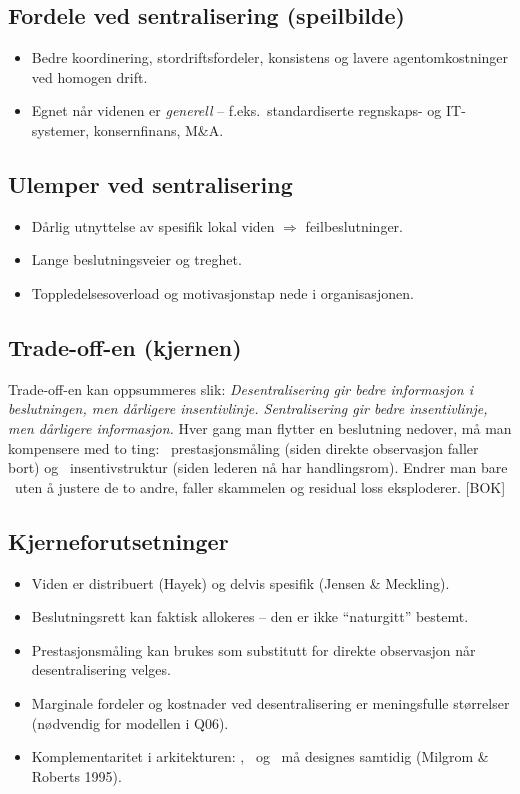 \subsection*{Fordele ved sentralisering (speilbilde)}
\begin{itemize}\setlength{\itemsep}{2pt}
\item Bedre koordinering, stordriftsfordeler, konsistens og lavere agentomkostninger ved homogen drift.
\item Egnet når videnen er \emph{generell} -- f.eks.\ standardiserte regnskaps- og IT-systemer, konsernfinans, M\&A.
\end{itemize}

\subsection*{Ulemper ved sentralisering}
\begin{itemize}\setlength{\itemsep}{2pt}
\item Dårlig utnyttelse av spesifik lokal viden $\Rightarrow$ feilbeslutninger.
\item Lange beslutningsveier og treghet.
\item Toppledelsesoverload og motivasjonstap nede i organisasjonen.
\end{itemize}

\subsection*{Trade-off-en (kjernen)}
Trade-off-en kan oppsummeres slik: \emph{Desentralisering gir bedre informasjon i beslutningen, men dårligere insentivlinje. Sentralisering gir bedre insentivlinje, men dårligere informasjon.} Hver gang man flytter en beslutning nedover, må man kompensere med to ting: \STwo\ prestasjonsmåling (siden direkte observasjon faller bort) og \SThree\ insentivstruktur (siden lederen nå har handlingsrom). Endrer man bare \SOne\ uten å justere de to andre, faller skammelen og residual loss eksploderer. [BOK]

\subsection*{Kjerneforutsetninger}
\begin{itemize}\setlength{\itemsep}{2pt}
\item Viden er distribuert (Hayek) og delvis spesifik (Jensen \& Meckling).
\item Beslutningsrett kan faktisk allokeres -- den er ikke ``naturgitt'' bestemt.
\item Prestasjonsmåling kan brukes som substitutt for direkte observasjon når desentralisering velges.
\item Marginale fordeler og kostnader ved desentralisering er meningsfulle størrelser (nødvendig for modellen i Q06).
\item Komplementaritet i arkitekturen: \SOne, \STwo\ og \SThree\ må designes samtidig (Milgrom \& Roberts 1995).
\end{itemize}

